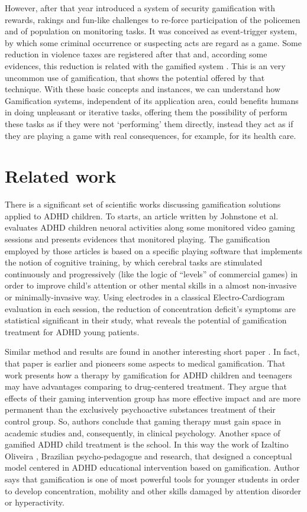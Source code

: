 However, after that year introduced a system of security gamification with rewards, rakings and fun-like challenges to re-force participation of the policemen and of population on monitoring tasks. It was conceived as event-trigger system, by which some criminal occurrence or suspecting acts are regard as a game. Some reduction in violence taxes are registered after that and, according some evidences, this reduction is related with the gamified system \citep{conf/cts/Aud13}. This is an very uncommon use of gamification, that shows the potential offered by that technique. With these basic concepts and instances, we can understand how Gamification systems, independent of its application area, could benefits humans in doing unpleasant or iterative tasks, offering them the possibility of perform these tasks as if they were not `performing' them directly, instead they act as if they are playing a game with real consequences, for example, for its health care.

\section{Related work}

There is a significant set of scientific works discussing gamification solutions applied to ADHD children. To starts, an article written by Johnstone et al. \citep{Johnstone-2013} evaluates ADHD children neuoral activities along some monitored video gaming sessions and presents evidences that monitored playing. The gamification employed by those articles is based on a specific playing software  that implements the notion of cognitive training, by which cerebral tasks are stimulated continuously and progressively (like the logic of ``levels'' of commercial games) in order to improve child's attention or other mental skills in a almost non-invasive or minimally-invasive way.  Using electrodes in a classical Electro-Cardiogram evaluation in each session, the reduction of concentration deficit's symptoms are statistical significant in their study, what reveals the potential of gamification treatment for ADHD young patients.

Similar method and results are found in another interesting short paper \citep{Nemeth}. In fact, that paper is earlier and pioneers some aspects to medical gamification. That work  presents how a therapy by gamification for ADHD children and teenagers may have advantages comparing to drug-centered treatment. They argue that effects of their gaming intervention group has more effective impact and are more permanent than the exclusively psychoactive substances treatment of their control group. So, authors conclude that gaming therapy must gain space in academic studies and, consequently, in clinical psychology. Another space of gamified ADHD child treatment is the school. In this way the work of Izaltino Oliveira \citep{Oliveira}, Brazilian psycho-pedagogue and research, that designed a conceptual model centered in ADHD educational intervention based on gamification. Author says that gamification is one of most powerful tools for younger students in order to develop concentration, mobility and other skills damaged by attention disorder or hyperactivity.

